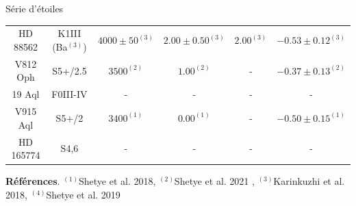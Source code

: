\documentclass[10pt]{beamer}
\begin{document}
\begin{frame}[fragile]{Série d'étoiles}
\begin{table}[h!]
\begin{center}
{\begin{tabular}{cccccc}
                    HD 88562  & K1III (Ba$^{(3)}$)& $4000\pm50^{(3)}$ & $2.00\pm0.50^{(3)}$ & $2.00^{(3)}$ & $-0.53\pm0.12^{(3)}$\\
                    V812 Oph  & S5+/2.5 & $3500^{(2)}$ & $1.00^{(2)}$ & - & $-0.37\pm0.13^{(2)}$\\
                    19 Aql  & F0III-IV & - & - & - & -  \\
                    V915 Aql  & S5+/2 & $3400^{(1)}$ & $0.00^{(1)}$ & - & $-0.50\pm0.15^{(1)}$ \\
                    HD 165774 & S4,6 & - & - & - & - \\
                    \hline
                \end{tabular}}
                \end{center}
            
            \footnotesize{\textbf{Références}. $^{(1)}$Shetye et al. 2018, $^{(2)}$Shetye et al. 2021 , $^{(3)}$Karinkuzhi et al. 2018, $^{(4)}$Shetye et al. 2019}
            \end{table}
\end{frame}
\end{document}
